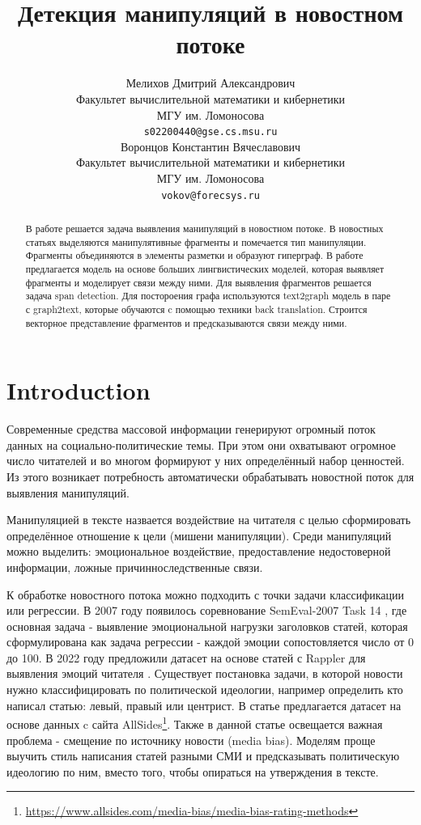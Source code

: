 \documentclass{article}
\title{Детекция манипуляций в новостном потоке}
\author{ Мелихов Дмитрий Александрович \\
        Факультет вычислительной математики и кибернетики \\
        МГУ им. Ломоносова \\
        \texttt{s02200440@gse.cs.msu.ru} \\
	\And
	Воронцов Константин Вячеславович \\
        Факультет вычислительной математики и кибернетики \\
        МГУ им. Ломоносова \\
        \texttt{vokov@forecsys.ru} \\
}
\date{}
\begin{document}
\maketitle

\begin{abstract}
В работе решается задача выявления манипуляций в новостном потоке. В новостных статьях выделяются манипулятивные фрагменты и помечается тип манипуляции. Фрагменты объединяются в элементы разметки и образуют гиперграф. В работе предлагается модель на основе больших лингвистических моделей, которая выявляет фрагменты и моделирует связи между ними. Для выявления фрагментов решается задача span detection. Для постороения графа используются text2graph модель в паре с graph2text, которые обучаются c помощью техники back translation. Строится векторное представление фрагментов и предсказываются связи между ними.
\end{abstract}



\section{Introduction}

Современные средства массовой информации генерируют огромный поток данных на социально-политические темы. При этом они охватывают огромное число читателей и во многом формируют у них определённый набор ценностей. Из этого возникает потребность автоматически обрабатывать новостной поток для выявления манипуляций.

Манипуляцией в тексте назвается воздействие на читателя с целью сформировать определённое отношение к цели (мишени манипуляции). Среди манипуляций можно выделить: эмоциональное воздействие, предоставление недостоверной информации, ложные причинноследственные связи.

К обработке новостного потока можно подходить с точки задачи классификации или регрессии. В 2007 году появилось соревнование SemEval-2007 Task 14 \cite{semeval}, где основная задача - выявление эмоциональной нагрузки заголовков статей, которая сформулирована как задача регрессии - каждой эмоции сопостовляется число от 0 до 100. В 2022 году предложили датасет на основе статей с Rappler для выявления эмоций читателя \cite{anoop22readers}.
Существует постановка задачи, в которой новости нужно классифицировать по политической идеологии, например определить кто написал статью: левый, правый или центрист. В статье \cite{bias} предлагается датасет на основе данных c сайта AllSides\footnote{\url{https://www.allsides.com/media-bias/media-bias-rating-methods}}. Также в данной статье освещается важная проблема - смещение по источнику новости (media bias). Моделям проще выучить стиль написания статей разными СМИ и предсказывать политическую идеологию по ним, вместо того, чтобы опираться на утверждения в тексте.
\end{document}
